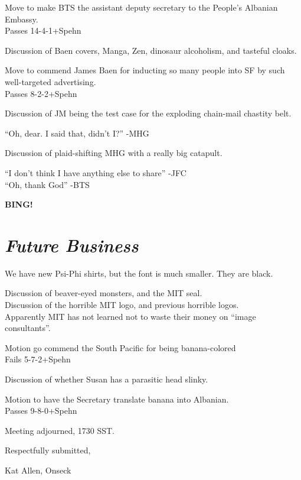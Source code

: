 \documentclass[12pt]{article}
\newcommand{\bing}{{\bf BING!} }
\newcommand{\goto}[1]{\bing \vskip 12pt \section*{{\em{#1}}}}
\begin{document}
Move to make BTS the assistant deputy secretary to the People's
Albanian Embassy.\\
Passes 14-4-1+Spehn

Discussion of Baen covers, Manga, Zen, dinosaur alcoholism, and
tasteful cloaks.

Move to commend James Baen for inducting so many people into SF by
such well-targeted advertising.\\
Passes 8-2-2+Spehn

Discussion of JM being the test case for the exploding chain-mail
chastity belt.

``Oh, dear. I said that, didn't I?'' -MHG

Discussion of plaid-shifting MHG with a really big catapult.

``I don't think I have anything else to share'' -JFC\\
``Oh, thank God'' -BTS

\goto{Future Business}
We have new Psi-Phi shirts, but the font is much smaller.
They are black.

Discussion of beaver-eyed monsters, and the MIT seal.\\
Discussion of the horrible MIT logo, and previous horrible logos.\\
Apparently MIT has not learned not to waste their money on ``image
consultants''.

Motion go commend the South Pacific for being banana-colored\\
Fails 5-7-2+Spehn

Discussion of whether Susan has a parasitic head slinky.

Motion to have the Secretary translate banana into Albanian.\\
Passes 9-8-0+Spehn

\vspace{12pt}

\noindent
Meeting adjourned, 1730 SST.

\vspace{18pt}

\centerline{Respectfully submitted,}
\centerline{Kat Allen,  Onseck}
\end{document}
